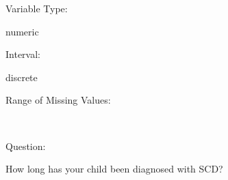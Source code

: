 \documentclass[
]{article}
\begin{document}
\begin{minipage}[t]{0.3\linewidth}

Variable Type:

\end{minipage}%
\begin{minipage}[t]{0.7\linewidth}

numeric

\end{minipage}

\begin{minipage}[t]{0.3\linewidth}

Interval:

\end{minipage}%
\begin{minipage}[t]{0.7\linewidth}

discrete

\end{minipage}

\begin{minipage}[t]{0.3\linewidth}

Range of Missing Values:

\end{minipage}%
\begin{minipage}[t]{0.7\linewidth}

~

\end{minipage}

\begin{minipage}[t]{0.3\linewidth}

Question:

\end{minipage}%
\begin{minipage}[t]{0.7\linewidth}

How long has your child been diagnosed with SCD?

\end{minipage}
\end{document}
